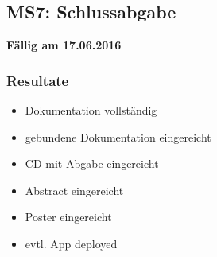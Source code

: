\subsection{MS7: Schlussabgabe}
\label{pm-ms7}
\textbf{Fällig am 17.06.2016}
\subsubsection{Resultate}
\begin{itemize}
	\item Dokumentation vollständig
	\item gebundene Dokumentation eingereicht
	\item CD mit Abgabe eingereicht
	\item Abstract eingereicht
	\item Poster eingereicht
	\item evtl. App deployed
\end{itemize}